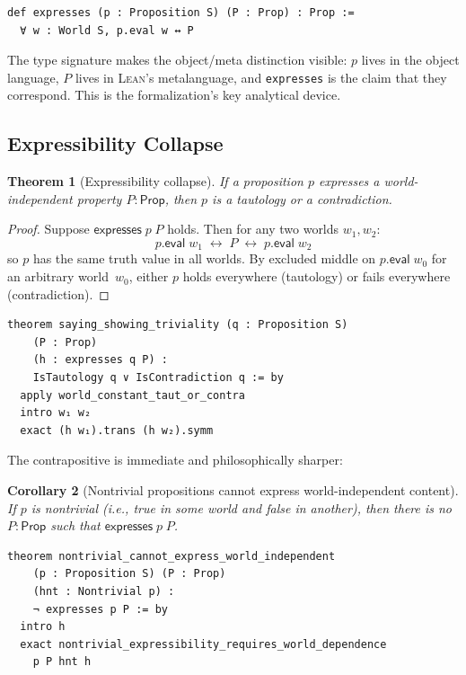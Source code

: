 \documentclass[10pt, letterpaper]{article}
\newtheorem{theorem}{Theorem}[section]
\newtheorem{corollary}[theorem]{Corollary}
\theoremstyle{definition}
\theoremstyle{remark}
\newcommand{\Prop}{\mathsf{Prop}}
\newcommand{\eval}{\mathsf{eval}}
\newcommand{\expresses}{\mathsf{expresses}}
\newcommand{\Lean}{\textsc{Lean}}
\begin{document}
\begin{lstlisting}
def expresses (p : Proposition S) (P : Prop) : Prop :=
  ∀ w : World S, p.eval w ↔ P
\end{lstlisting}

\noindent
The type signature makes the object/meta distinction visible:
$p$ lives in the object language, $P$ lives in \Lean's
metalanguage, and \texttt{expresses} is the claim that they
correspond.  This is the formalization's key analytical device.

\subsection{Expressibility Collapse}
\label{sec:collapse}

\begin{theorem}[Expressibility collapse]
\label{thm:collapse}
If a proposition $p$ expresses a world-independent property
$P : \Prop$, then $p$ is a tautology or a contradiction.
\end{theorem}

\begin{proof}
Suppose $\expresses\;p\;P$ holds.  Then for any two worlds
$w_1, w_2$:
\[
  p.\eval\;w_1 \;\leftrightarrow\; P \;\leftrightarrow\;
  p.\eval\;w_2
\]
so $p$ has the same truth value in all worlds.  By excluded
middle on $p.\eval\;w_0$ for an arbitrary world~$w_0$, either
$p$ holds everywhere (tautology) or fails everywhere
(contradiction).
\end{proof}

\begin{lstlisting}
theorem saying_showing_triviality (q : Proposition S)
    (P : Prop)
    (h : expresses q P) :
    IsTautology q ∨ IsContradiction q := by
  apply world_constant_taut_or_contra
  intro w₁ w₂
  exact (h w₁).trans (h w₂).symm
\end{lstlisting}

\noindent
The contrapositive is immediate and philosophically sharper:

\begin{corollary}[Nontrivial propositions cannot express
world-independent content]
\label{cor:nontrivial}
If $p$ is nontrivial (i.e., true in some world and false in
another), then there is no $P : \Prop$ such that
$\expresses\;p\;P$.
\end{corollary}

\begin{lstlisting}
theorem nontrivial_cannot_express_world_independent
    (p : Proposition S) (P : Prop)
    (hnt : Nontrivial p) :
    ¬ expresses p P := by
  intro h
  exact nontrivial_expressibility_requires_world_dependence
    p P hnt h
\end{lstlisting}
\end{document}
